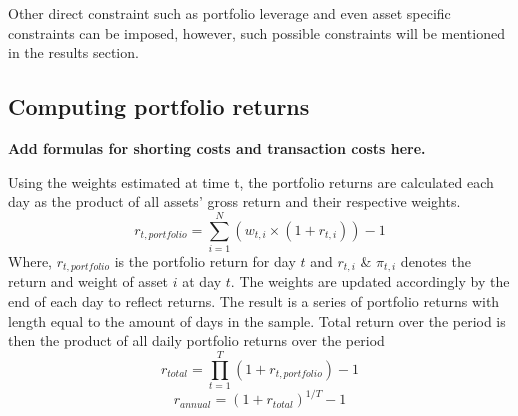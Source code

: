 Other direct constraint such as portfolio leverage and even asset specific constraints can be imposed, however, such possible constraints will be mentioned in the results section.

\subsection{Computing portfolio returns}

\textbf{Add formulas for shorting costs and transaction costs here.}

Using the weights estimated at time t, the portfolio returns are calculated each day as the product of all assets' gross return and their respective weights.
\begin{equation}
    r_{t,portfolio} = \sum_{i=1}^N \left(w_{t,i}\times(1+r_{t,i})\right)  - 1
\end{equation}
Where, $r_{t,portfolio}$ is the portfolio return for day $t$ and $r_{t,i}$ \& $\pi_{t,i}$ denotes the return and weight of asset $i$ at day $t$. The weights are updated accordingly by the end of each day to reflect returns. The result is a series of portfolio returns with length equal to the amount of days in the sample. Total return over the period is then the product of all daily portfolio returns over the period
\begin{equation}
    r_{total} = \prod_{t=1}^T (1+r_{t, portfolio} ) - 1
    \label{eq:total_ret}
\end{equation}
\begin{equation}
    r_{annual}=(1+r_{total})^{1/T}-1
    \label{eq:annual_ret}
\end{equation}
